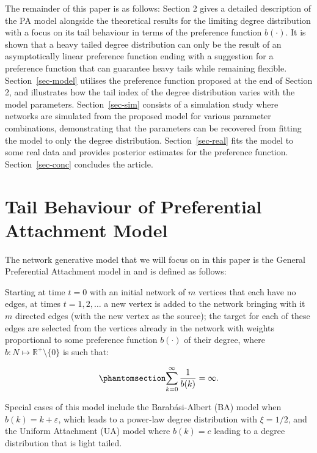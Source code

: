 \documentclass[
  sn-basic,
]{sn-jnl}
\theoremstyle{plain}
\theoremstyle{plain}
\theoremstyle{remark}
\begin{document}
The remainder of this paper is as follows: Section 2 gives a detailed
description of the PA model alongside the theoretical results for the
limiting degree distribution with a focus on its tail behaviour in terms
of the preference function \(b(\cdot)\). It is shown that a heavy tailed
degree distribution can only be the result of an asymptotically linear
preference function ending with a suggestion for a preference function
that can guarantee heavy tails while remaining flexible.
Section~\ref{sec-model} utilises the preference function proposed at the
end of Section 2, and illustrates how the tail index of the degree
distribution varies with the model parameters. Section~\ref{sec-sim}
consists of a simulation study where networks are simulated from the
proposed model for various parameter combinations, demonstrating that
the parameters can be recovered from fitting the model to only the
degree distribution. Section~\ref{sec-real} fits the model to some real
data and provides posterior estimates for the preference function.
Section~\ref{sec-conc} concludes the article.

\newpage

\section{Tail Behaviour of Preferential Attachment
Model}\label{sec-tail}

The network generative model that we will focus on in this paper is the
General Preferential Attachment model in \citet{rudas07} and is defined
as follows:

Starting at time \(t=0\) with an initial network of \(m\) vertices that
each have no edges, at times \(t=1,2,\ldots\) a new vertex is added to
the network bringing with it \(m\) directed edges (with the new vertex
as the source); the target for each of these edges are selected from the
vertices already in the network with weights proportional to some
preference function \(b(\cdot)\) of their degree, where
\(b: N \mapsto \mathbb R^+\setminus\{0\}\) is such that:

\begin{equation}\phantomsection\label{eq-condb2}{
\sum_{k=0}^\infty\frac{1}{b(k)} = \infty.
}\end{equation}

Special cases of this model include the Barabási-Albert (BA) model when
\(b(k) = k+\varepsilon\), which leads to a power-law degree distribution
with \(\xi=1/2\), and the Uniform Attachment (UA) model where \(b(k)=c\)
leading to a degree distribution that is light tailed.
\end{document}
